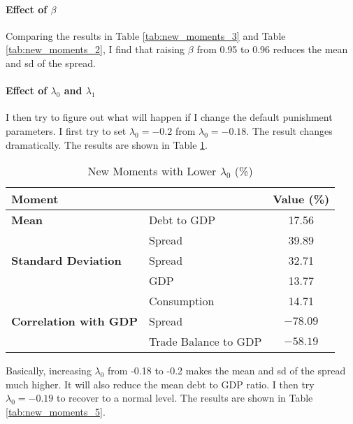 \documentclass{article}
\begin{document}
\paragraph{Effect of $\beta$} Comparing the results in Table \ref{tab:new_moments_3} and Table
\ref{tab:new_moments_2}, I find that raising $\beta$ from 0.95 to 0.96 reduces
the mean and sd of the spread.

\paragraph{Effect of $\lambda_0$ and $\lambda_1$} I then try to figure out what will happen if I change the default punishment
parameters. I first try to set $\lambda_0 = -0.2$ from $\lambda_0 = -0.18$. The
result changes dramatically. The results are shown in Table
\ref{tab:new_moments_4}.

\begin{table}[h]
    \centering
    \begin{tabular}{llc}
        \toprule
        \textbf{Moment}               &                      & \textbf{Value (\%)} \\
        \midrule
        \textbf{Mean}                 & Debt to GDP          & 17.56               \\
                                      & Spread               & 39.89               \\
        \addlinespace
        \textbf{Standard Deviation}   & Spread               & 32.71               \\
                                      & GDP                  & 13.77               \\
                                      & Consumption          & 14.71               \\
        \addlinespace
        \textbf{Correlation with GDP} & Spread               & $-78.09$            \\
                                      & Trade Balance to GDP & $-58.19$            \\
        \bottomrule
    \end{tabular}
    \caption{New Moments with Lower $\lambda_0$ (\%)} \label{tab:new_moments_4}
\end{table}

Basically, increasing $\lambda_0$ from -0.18 to -0.2 makes the mean and sd of
the spread much higher. It will also reduce the mean debt to GDP ratio. I then
try $\lambda_0 = -0.19$ to recover to a normal level. The results are shown in
Table \ref{tab:new_moments_5}.
\end{document}
